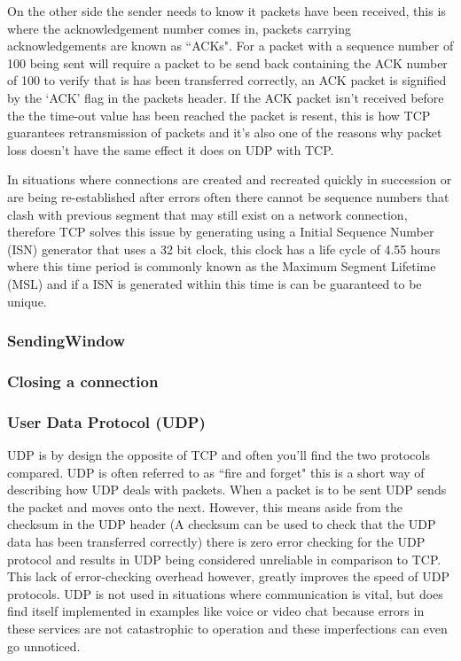 On the other side the sender needs to know it packets have been received, this is where the acknowledgement number comes in, packets carrying acknowledgements are known as ``ACKs". For a packet with a sequence number of 100 being sent will require a packet to be send back containing the ACK number of 100 to verify that is has been transferred correctly, an ACK packet is signified by the `ACK' flag in the packets header. If the ACK packet isn't received before the the time-out value has been reached the packet is resent, this is how TCP guarantees retransmission of packets and it's also one of the reasons why packet loss doesn't have the same effect it does on UDP with TCP.

In situations where connections are created and recreated quickly in succession or are being re-established after errors often there cannot be sequence numbers that clash with previous segment that may still exist on a network connection, therefore TCP solves this issue by generating using a Initial Sequence Number (ISN) generator that uses a 32 bit clock, this clock has a life cycle of 4.55 hours where this time period is commonly known as the Maximum Segment Lifetime (MSL) and if a ISN is generated within this time is can be guaranteed to be unique.

\subsubsection{Sending\Reciving Window}


\subsubsection{Closing a connection}


\subsubsection{User Data Protocol (UDP)}
UDP is by design the opposite of TCP and often you'll find the two protocols compared. UDP is often referred to as ``fire and forget" \citep{kempf2011thoughts} this is a short way of describing how UDP deals with packets. When a packet is to be sent UDP sends the packet and moves onto the next. However, this means aside from the checksum in the UDP header (A checksum can be used to check that the UDP data has been transferred correctly) there is zero error checking for the UDP protocol and results in UDP being considered unreliable in comparison to TCP. This lack of error-checking overhead however, greatly improves the speed of UDP protocols. UDP is not used in situations where communication is vital, but does find itself implemented in examples like voice or video chat because errors in these services are not catastrophic to operation and these imperfections can even go unnoticed. 

